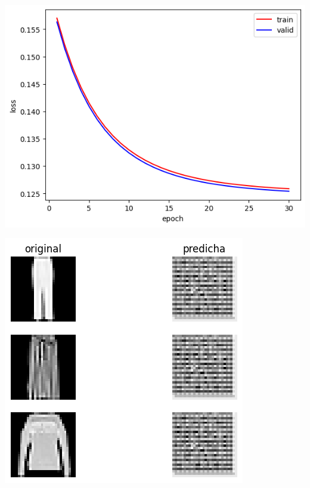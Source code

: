 \documentclass[aps,prl,reprint,groupedaddress]{revtex4-2}
\newenvironment{Figura}
  {\par\medskip\noindent\minipage{\linewidth}}
  {\endminipage\par\medskip}
\begin{document}
\begin{Figura}
  \centering
  \begin{minipage}[t]{0.58\linewidth}
    \centering
    \includegraphics[width=\textwidth]{figs1/modelo_con_sdg.png}
    \label{fig-model-sgd}
  \end{minipage}%
  \hfill
  \begin{minipage}[t]{0.41\linewidth}
    \centering
    \includegraphics[width=\textwidth]{figs1/test_modelo_sdg.png}
    \label{fig-model-sgdb}
  \end{minipage}
\end{Figura}
\end{document}
